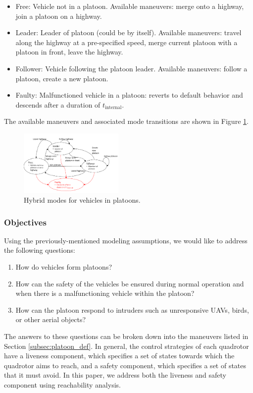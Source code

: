 \begin{itemize}
\item Free: Vehicle not in a platoon. Available maneuvers: merge onto a highway, join a platoon on a highway.
\item Leader: Leader of platoon (could be by itself). Available maneuvers: travel along the highway at a pre-specified speed, merge current platoon with a platoon in front, leave the highway.
\item Follower: Vehicle following the platoon leader. Available maneuvers: follow a platoon, create a new platoon.
\item Faulty: Malfunctioned vehicle in a platoon: reverts to default behavior and descends after a duration of $t_\text{internal}$.
\end{itemize}

The available maneuvers and associated mode transitions are shown in Figure \ref{fig:vehicleModes}.

\begin{figure}
	\centering
	\includegraphics[width=0.45\textwidth]{"fig/vehicleModes"}
	\caption{Hybrid modes for vehicles in platoons.}
	\label{fig:vehicleModes}
\end{figure}

\subsubsection{Objectives}
Using the previously-mentioned modeling assumptions, we would like to address the following questions:

\begin{enumerate}
\item How do vehicles form platoons?
\item How can the safety of the vehicles be ensured during normal operation and when there is a malfunctioning vehicle within the platoon?
\item How can the platoon respond to intruders such as unresponsive UAVs, birds, or other aerial objects?
\end{enumerate}

The answers to these questions can be broken down into the maneuvers listed in Section \ref{subsec:platoon_def}. In general, the control strategies of each quadrotor have a liveness component, which specifies a set of states towards which the quadrotor aims to reach, and a safety component, which specifies a set of states that it must avoid. In this paper, we address both the liveness and safety component using reachability analysis.
